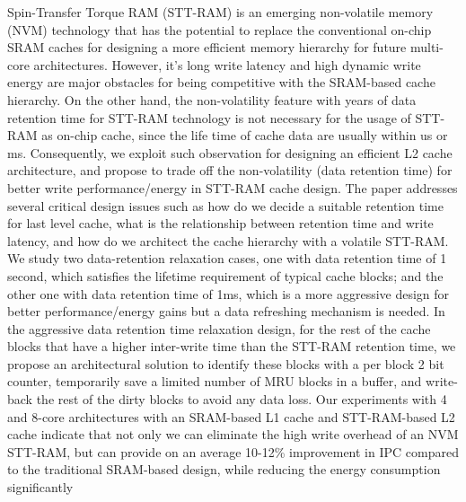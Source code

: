 \singlespacing

Spin-Transfer Torque RAM (STT-RAM) is an emerging non-volatile memory (NVM)
technology that has the potential to replace the conventional
on-chip SRAM caches for designing a more efficient memory hierarchy for
future multi-core architectures.
However, it's long write latency and high dynamic
write energy are major obstacles for being competitive with the SRAM-based cache hierarchy.
On the other hand, the non-volatility feature with years of data retention time for STT-RAM technology is not necessary for the usage of STT-RAM as on-chip cache, since the life time of cache data are usually within us or ms. Consequently,  we exploit such observation for designing an efficient L2 cache
architecture, and propose to trade off the non-volatility (data retention time)
for better write performance/energy in STT-RAM cache design. The paper addresses several critical design issues such as how do we decide a suitable retention time for last level cache,
what is the relationship between retention time and write latency,
and how do we architect the cache hierarchy with a volatile STT-RAM.
We study two
data-retention relaxation cases, one with data retention time of 1 second, which satisfies the lifetime requirement of typical cache blocks; and the other one with data retention time of 1ms, which is a more aggressive design for better performance/energy gains but a data refreshing mechanism is needed.
In the aggressive data retention time relaxation design, for the rest of the cache blocks that have a higher inter-write
time than the STT-RAM retention time, we propose an architectural solution to identify these blocks
with a per block 2 bit counter, temporarily save a limited number of MRU blocks in a buffer,
and write-back the rest of the dirty blocks to avoid any data loss.
Our experiments with 4 and 8-core architectures with an SRAM-based L1 cache and STT-RAM-based L2 cache
indicate that not only we can eliminate the high write overhead of an NVM STT-RAM, but can provide
on an average 10-12\% improvement in IPC compared to the traditional SRAM-based
design, while reducing the energy consumption significantly

